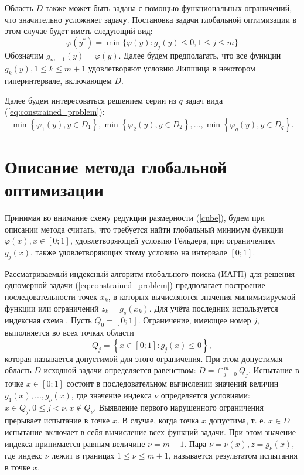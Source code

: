 \documentclass[11pt, oneside, a4paper]{article}
\begin{document}
Область \(D\) также может быть задана с помощью функциональных ограничений, что
значительно усложняет задачу.
Постановка задачи глобальной оптимизации в этом случае будет иметь следующий вид:
\begin{equation}
  \label{eq:constrained_problem}
  \varphi(y^*)=\min\{\varphi(y):g_j(y)\leqslant 0, 1\leqslant j\leqslant m\}
\end{equation}
Обозначим \(g_{m+1}(y)=\varphi(y)\). Далее будем предполагать, что все функции \(g_k(y),1\leqslant k \leqslant m+1\)
удовлетворяют условию Липшица в некотором гиперинтервале, включающем \(D\).

Далее будем интересоваться решением серии из \(q\) задач вида (\ref{eq:constrained_problem}):
\begin{equation}
  \label{eq:many_problems}
  \min\left\{\varphi_1(y), y\in D_1 \right\}, \min\left\{\varphi_2(y), y\in D_2\right\},..., \min\left\{\varphi_q(y), y\in D_q\right\}.
\end{equation}

\section{Описание метода глобальной оптимизации}

Принимая во внимание схему редукции размерности (\ref{cube}), будем при описании метода считать, что
требуется найти глобальный минимум функции \(\varphi(x), x\in[0;1]\),
удовлетворяющей условию Гёльдера, при ограничениях \(g_j(x)\), также
удовлетворяющих этому условию на интервале \([0;1]\).

Рассматриваемый индексный алгоритм глобального поиска (ИАГП) для решения
одномерной задачи (\ref{eq:constrained_problem}) предполагает построение последовательности
точек \(x_k\), в которых вычисляются значения минимизируемой функции или ограничений \(z_k = g_s(x_k)\).
Для учёта последних используется индексная схема \cite{Strongin2000}. Пусть \(Q_0=[0;1]\). Ограничение, имеющее номер
 \(j\), выполняется во всех точках области
\begin{displaymath}
  Q_j=\left\{x\in [0;1]:g_j(x)\leq 0\right\},
\end{displaymath}
которая называется допустимой для этого ограничения. При этом допустимая область \(D\)
исходной задачи определяется равенством: \(D=\cap _{j=0}^{m}Q_{j}\).
Испытание в точке \(x\in [0;1]\) состоит в последовательном вычислении значений
величин \(g_{1}(x),...,g_{\nu }(x)\), где значение индекса \(\nu\) определяется условиями:
\(x\in Q_{j},0\leqslant j<\nu ,x\notin Q_{\nu }\). Выявление первого нарушенного ограничения
прерывает испытание в точке \(x\). В случае, когда точка \(x\)  допустима, т. е.
\(x\in D\) испытание включает в себя вычисление всех функций задачи. При этом значение
индекса принимается равным величине \(\nu =m+1\). Пара \(\nu =\nu (x),z=g_{\nu }(x)\),
где индекс \(\nu\) лежит в границах \(1\leqslant \nu \leqslant m+1\), называется результатом
испытания в точке \(x\).
\end{document}
